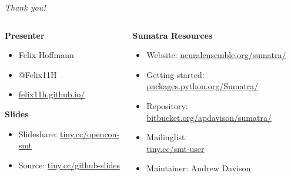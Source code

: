 \documentclass[xcolor=svgnames,11pt]{beamer}
\begin{document}
\begin{frame}
  \begin{center} 

    \Large \textit{Thank you!}
      \end{center}
      \vspace{0.35cm}

    \begin{columns}[t]
      \begin{column}{0.4\textwidth}        
        \textbf{Presenter}
        \normalsize
        \vspace{0.18cm}
        \begin{itemize}[leftmargin=0.6cm]
          \item[] Felix Hoffmann
          \item[] @Felix11H
          \item[] \href{http://felix11h.github.io/}{felix11h.github.io/}
        \end{itemize}

        \vspace{0.38cm}
        \textbf{Slides}
        \normalsize
        \vspace{0.18cm}
        \begin{itemize}[leftmargin=0.6cm]
          \item[] Slideshare: \href{http://tiny.cc/opencon-smt}{tiny.cc/opencon-smt}
          \item[] Source: \href{http://tiny.cc/github-slides}{tiny.cc/github-slides}
        \end{itemize}


\end{column}
\begin{column}{0.64\textwidth}
  \textbf{Sumatra Resources}
  \vspace{0.28cm}
    \normalsize 
    \begin{itemize}[leftmargin=0.6cm]
      \item[] Website:
    \href{http://neuralensemble.org/sumatra/}{neuralensemble.org/sumatra/}\\
    \item[]Getting started: \href{http://packages.python.org/Sumatra/}{packages.python.org/Sumatra/}\\
    \item[]Repository:
    \href{http://bitbucket.org/apdavison/sumatra/}{bitbucket.org/apdavison/sumatra/}
    \item[] Mailinglist: \\\href{http://tiny.cc/smt-user}{tiny.cc/smt-user}
    \item[] Maintainer: Andrew Davison 



\end{itemize}
\end{column}
\end{columns}
\end{frame}
\end{document}
